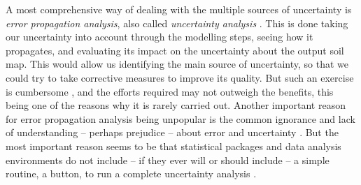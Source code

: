 A most comprehensive way of dealing with the multiple sources of uncertainty is \emph{error propagation 
analysis},
also called \emph{uncertainty analysis} \cite{HeuvelinkEtAl1989, Taylor1997}. This is done taking
our uncertainty into account through the modelling steps, seeing how it propagates, and
evaluating its impact on the uncertainty about the output soil map. This would allow us identifying the
main source of uncertainty, so that we could try to take corrective measures to improve its quality.
But such an exercise is cumbersome \cite{NelsonEtAl2011}, and the efforts required may not
outweigh the benefits, this being one of the reasons why it is rarely carried out. Another important
reason for error propagation analysis being unpopular is the common ignorance and lack of
understanding -- perhaps prejudice -- about error and uncertainty \cite{Wechsler2003, Heuvelink2005}.
But the most important reason seems to be that statistical packages and data analysis environments do
not include -- if they ever will or should include -- a simple routine, a button, to run a complete
uncertainty analysis \cite{HeuvelinkEtAl2006b}.


